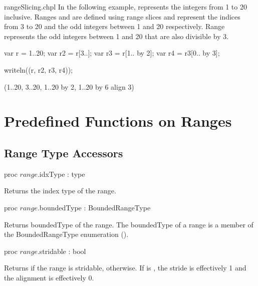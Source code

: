 \begin{chapelexample}{rangeSlicing.chpl}
In the following example,  represents the integers from 1 to
20 inclusive.  Ranges  and  are defined using range
slices and represent the indices from 3 to 20 and the odd integers
between 1 and 20 respectively. Range  represents the odd
integers between 1 and 20 that are also divisible by 3.
\begin{chapel}
var r = 1..20;
var r2 = r[3..];
var r3 = r[1.. by 2];
var r4 = r3[0.. by 3];
\end{chapel}
\begin{chapelpost}
writeln((r, r2, r3, r4));
\end{chapelpost}
\begin{chapeloutput}
(1..20, 3..20, 1..20 by 2, 1..20 by 6 align 3)
\end{chapeloutput}
\end{chapelexample}

\section{Predefined Functions on Ranges}
\label{Predefined_Range_Functions}

\subsection{Range Type Accessors}
\label{Range_Type_Accessors}

\begin{protohead}
proc $range$.idxType : type
\end{protohead}
\begin{protobody}
Returns the index type of the range.  
\end{protobody}

\begin{protohead}
proc $range$.boundedType : BoundedRangeType
\end{protohead}
\begin{protobody}
Returns boundedType of the range.  The boundedType of a range is a member of the
BoundedRangeType enumeration ().
\end{protobody}

\begin{protohead}
proc $range$.stridable : bool
\end{protohead}
\begin{protobody}
Returns  if the range is stridable,  otherwise.  If  is
, the stride is effectively 1 and the alignment is effectively 0.
\end{protobody}

